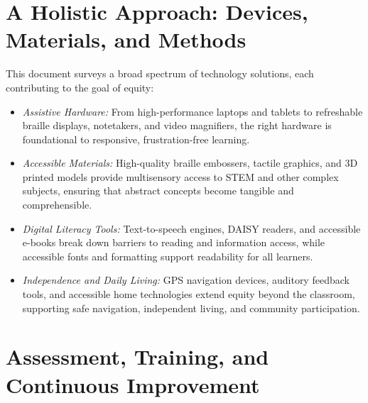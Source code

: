 \section{A Holistic Approach: Devices, Materials, and Methods}
\label{sec:intro-holistic-approach}

This document surveys a broad spectrum of \gls{technology} solutions, each contributing to the goal of equity:

\begin{itemize}
	\item \emph{Assistive Hardware:} From high-performance laptops and tablets to refreshable braille displays\supercite{FocusBlue, BrailliantBI40X}, notetakers\supercite{BrailleNoteTouchPlus32, BrailleSense6}, and video magnifiers\supercite{PerkinsVideoMagnifier}, the right hardware is foundational to responsive, frustration-free learning.
	\item \emph{Accessible Materials:} High-quality braille embossers\supercite{IrieBrailleTrac}, tactile graphics\supercite{CreatingTactileGraphics, TactileView}, and 3D printed models\supercite{See3D, Karbowski2020} provide multisensory access to STEM and other complex subjects, ensuring that abstract concepts become tangible and comprehensible.
	\item \emph{Digital Literacy Tools:} Text-to-speech engines\supercite{VisionAid2025}, DAISY readers\supercite{DAISY2024}, and accessible e-books\supercite{Bookshare} break down barriers to reading and information access, while accessible fonts\supercite{AccessiBeFonts, HubSpotFonts} and formatting support readability for all learners.
	\item \emph{Independence and Daily Living:} GPS navigation devices\supercite{AFBGPS2023}, auditory feedback tools\supercite{ABlindLegend}, and accessible home technologies\supercite{AllAboutVision2023} extend equity beyond the classroom, supporting safe navigation, independent living, and community participation.
\end{itemize}

\section{Assessment, Training, and Continuous Improvement}
\label{sec:intro-assessment-training}

